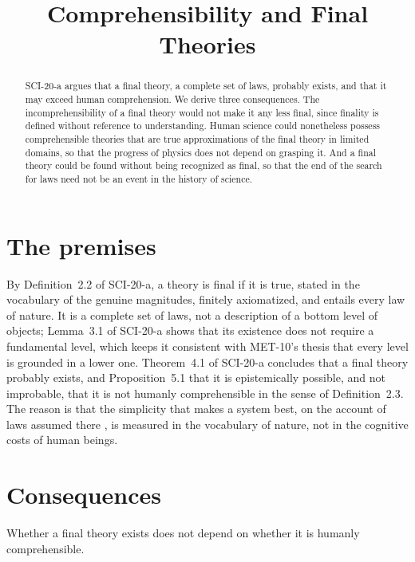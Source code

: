 \documentclass{situationist-preprint}
\title{Comprehensibility and Final Theories}
\begin{document}
\maketitle

\begin{abstract}
SCI-20-a argues that a final theory, a complete set of laws, probably exists, and that it may exceed human comprehension. We derive three consequences. The incomprehensibility of a final theory would not make it any less final, since finality is defined without reference to understanding. Human science could nonetheless possess comprehensible theories that are true approximations of the final theory in limited domains, so that the progress of physics does not depend on grasping it. And a final theory could be found without being recognized as final, so that the end of the search for laws need not be an event in the history of science.
\end{abstract}

\section{The premises}

By Definition~2.2 of SCI-20-a, a theory is final if it is true, stated in the vocabulary of the genuine magnitudes, finitely axiomatized, and entails every law of nature. It is a complete set of laws, not a description of a bottom level of objects; Lemma~3.1 of SCI-20-a shows that its existence does not require a fundamental level, which keeps it consistent with MET-10's thesis that every level is grounded in a lower one. Theorem~4.1 of SCI-20-a concludes that a final theory probably exists, and Proposition~5.1 that it is epistemically possible, and not improbable, that it is not humanly comprehensible in the sense of Definition~2.3. The reason is that the simplicity that makes a system best, on the account of laws assumed there \citep{Lewis1983,Lewis1994}, is measured in the vocabulary of nature, not in the cognitive costs of human beings.

\section{Consequences}

\begin{corollary}\label{c:indep}
Whether a final theory exists does not depend on whether it is humanly comprehensible.
\end{corollary}
\end{document}
